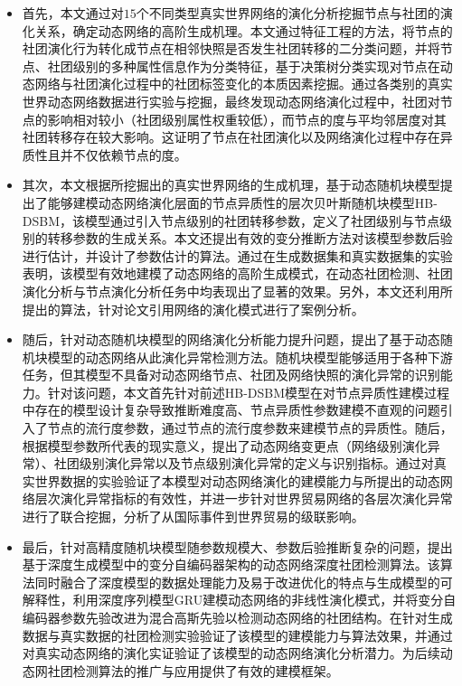 \begin{itemize}
	\item 首先，本文通过对$15$个不同类型真实世界网络的演化分析挖掘节点与社团的演化关系，确定动态网络的高阶生成机理。本文通过特征工程的方法，将节点的社团演化行为转化成节点在相邻快照是否发生社团转移的二分类问题，并将节点、社团级别的多种属性信息作为分类特征，基于决策树分类实现对节点在动态网络与社团演化过程中的社团标签变化的本质因素挖掘。通过各类别的真实世界动态网络数据进行实验与挖掘，最终发现动态网络演化过程中，社团对节点的影响相对较小（社团级别属性权重较低），而节点的度与平均邻居度对其社团转移存在较大影响。这证明了节点在社团演化以及网络演化过程中存在异质性且并不仅依赖节点的度。
	

	
	\item 其次，本文根据所挖掘出的真实世界网络的生成机理，基于动态随机块模型提出了能够建模动态网络演化层面的节点异质性的层次贝叶斯随机块模型HB-DSBM，该模型通过引入节点级别的社团转移参数，定义了社团级别与节点级别的转移参数的生成关系。本文还提出有效的变分推断方法对该模型参数后验进行估计，并设计了参数估计的算法。通过在生成数据集和真实数据集的实验表明，该模型有效地建模了动态网络的高阶生成模式，在动态社团检测、社团演化分析与节点演化分析任务中均表现出了显著的效果。另外，本文还利用所提出的算法，针对论文引用网络的演化模式进行了案例分析。
	
	\item 随后，针对动态随机块模型的网络演化分析能力提升问题，提出了基于动态随机块模型的动态网络从此演化异常检测方法。随机块模型能够适用于各种下游任务，但其模型不具备对动态网络节点、社团及网络快照的演化异常的识别能力。针对该问题，本文首先针对前述HB-DSBM模型在对节点异质性建模过程中存在的模型设计复杂导致推断难度高、节点异质性参数建模不直观的问题引入了节点的流行度参数，通过节点的流行度参数来建模节点的异质性。随后，根据模型参数所代表的现实意义，提出了动态网络变更点（网络级别演化异常）、社团级别演化异常以及节点级别演化异常的定义与识别指标。通过对真实世界数据的实验验证了本模型对动态网络演化的建模能力与所提出的动态网络层次演化异常指标的有效性，并进一步针对世界贸易网络的各层次演化异常进行了联合挖掘，分析了从国际事件到世界贸易的级联影响。
	
	
	\item 最后，针对高精度随机块模型随参数规模大、参数后验推断复杂的问题，提出基于深度生成模型中的变分自编码器架构的动态网络深度社团检测算法。该算法同时融合了深度模型的数据处理能力及易于改进优化的特点与生成模型的可解释性，利用深度序列模型GRU建模动态网络的非线性演化模式，并将变分自编码器参数先验改进为混合高斯先验以检测动态网络的社团结构。在针对生成数据与真实数据的社团检测实验验证了该模型的建模能力与算法效果，并通过对真实动态网络的演化实证验证了该模型的动态网络演化分析潜力。为后续动态网社团检测算法的推广与应用提供了有效的建模框架。
\end{itemize}




